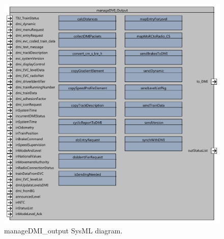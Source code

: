 \begin{figure}
\center
\includegraphics[width=\textwidth]{images/F2_11_manageDMI_Output.pdf}
\caption{manageDMI\_output SysML diagram.}\label{f:ManageDMIOutput}
\end{figure}


